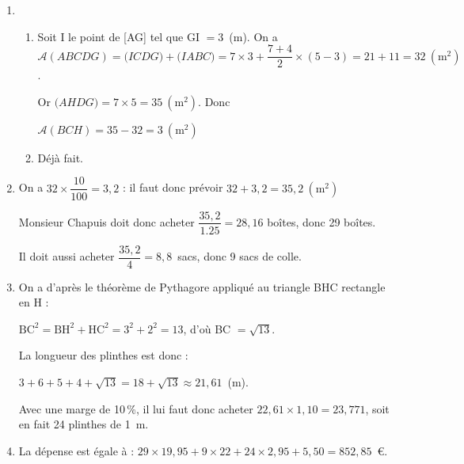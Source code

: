 \begin{enumerate}
\item 
	\begin{enumerate}
		\item %
		Soit I le point de [AG] tel que GI $= 3$~(m).
On a $\mathcal{A}(ABCDG) = \mathcal(ICDG) + \mathcal(IABC) = 7 \times 3 + \dfrac{7 + 4}{2}\times (5 - 3) = 21 + 11 = 32~\left(\text{m}^2\right)$.
		
Or $\mathcal(AHDG) = 7 \times 5 = 35~\left(\text{m}^2\right)$. Donc 
		
$\mathcal{A}(BCH) = 35 - 32 = 3~\left(\text{m}^2\right)$
		\item %
Déjà  fait.
	\end{enumerate}
\item %
On a $32 \times \dfrac{10}{100} = 3,2$ : il faut donc prévoir $32 + 3,2 = 35,2~\left(\text{m}^2\right)$	
	

Monsieur Chapuis doit donc acheter $\dfrac{35,2}{1.25} = 28,16$ boîtes, donc 29 boîtes.

Il doit aussi acheter $\dfrac{35,2}{4} = 8,8$~sacs, donc 9 sacs de colle.
\item %
On a d'après le théorème de Pythagore appliqué au triangle BHC rectangle en H :

$\text{BC}^2 = \text{BH}^2 + \text{HC}^2 = 3^2 + 2^2 = 13$, d'où BC $ = \sqrt{13}$.

La longueur des plinthes est donc :

$3 + 6 + 5  + 4 + \sqrt{13} = 18 + \sqrt{13} \approx 21,61$~(m).

Avec une marge de 10\,\%, il lui faut donc acheter $22,61 \times 1,10 = 23,771$, soit en fait 24 plinthes de 1~m.
	
	
\item %
La dépense est égale à  : $29 \times 19,95 + 9 \times 22 + 24 \times 2,95 + 5,50 = 852,85$~\euro.
\end{enumerate}

\vspace{0,5cm}

